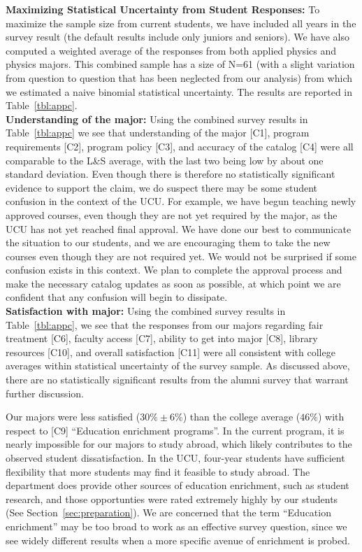 \documentclass[12pt]{article}
\begin{document}
\noindent
{\bf Maximizing Statistical Uncertainty from Student Responses:} To
maximize the sample size from current students, we have included all
years in the survey result (the default results include only juniors
and seniors).  We have also computed a weighted average of the
responses from both applied physics and physics majors.  This combined
sample has a size of N=61 (with a slight variation from question to
question that has been neglected from our analysis) from which we
estimated a naive binomial statistical uncertainty.  The results are
reported in Table~\ref{tbl:appc}.\\[3pt]

\noindent
{\bf Understanding of the major:} Using the combined survey results in
Table~\ref{tbl:appc} we see that understanding of the major [C1],
program requirements [C2], program policy [C3], and accuracy of the
catalog [C4] were all comparable to the L\&S average, with the last
two being low by about one standard deviation.  Even though there is
therefore no statistically significant evidence to support the claim,
we do suspect there may be some student confusion in the context of
the UCU.  For example, we have begun teaching newly approved courses,
even though they are not yet required by the major, as the UCU has not
yet reached final approval.  We have done our best to communicate the
situation to our students, and we are encouraging them to take the new
courses even though they are not required yet.  We would not be
surprised if some confusion exists in this context.  We plan to
complete the approval process and make the necessary catalog updates
as soon as possible, at which point we are confident that any
confusion will begin to dissipate.\\[3pt]

\noindent
{\bf Satisfaction with major:} Using the combined survey results in
Table~\ref{tbl:appc}, we see that the responses from our majors
regarding fair treatment [C6], faculty access [C7], ability to get
into major [C8], library resources [C10], and overall satisfaction
[C11] were all consistent with college averages within statistical
uncertainty of the survey sample.  As discussed above, there are no
statistically significant results from the alumni survey that warrant
further discussion.

Our majors were less satisfied ($30\% \pm 6\%$) than the college
average ($46\%$) with respect to [C9] ``Education enrichment
programs''.  In the current program, it is nearly impossible for our
majors to study abroad, which likely contributes to the observed
student dissatisfaction.  In the UCU, four-year students have
sufficient flexibility that more students may find it feasible to
study abroad.  The department does provide other sources of education
enrichment, such as student research, and those opportunties were
rated extremely highly by our students (See
Section~\ref{sec:preparation}).  We are concerned that the term
``Education enrichment'' may be too broad to work as an effective
survey question, since we see widely different results when a more
specific avenue of enrichment is probed.
\end{document}
